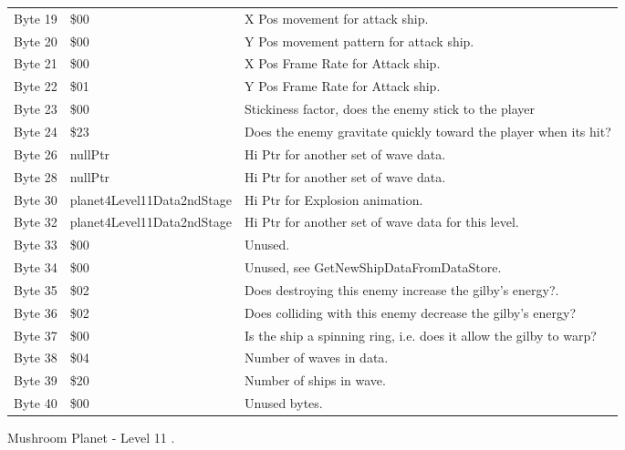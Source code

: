 \begin{figure}[H]
{\begin{adjustbox}{width=12cm}
\begin{tabular}{lll}
 Byte 19 & \$00                        & X Pos movement for attack ship.                                    \\
 Byte 20 & \$00                        & Y Pos movement pattern for attack ship.                            \\
 Byte 21 & \$00                        & X Pos Frame Rate for Attack ship.                                  \\
 Byte 22 & \$01                        & Y Pos Frame Rate for Attack ship.                                  \\
 Byte 23 & \$00                        & Stickiness factor, does the enemy stick to the player              \\
 Byte 24 & \$23                        & Does the enemy gravitate quickly toward the player when its hit?   \\
 Byte 26 & nullPtr                    & Hi Ptr for another set of wave data.                               \\
 Byte 28 & nullPtr                    & Hi Ptr for another set of wave data.                               \\
 Byte 30 & planet4Level11Data2ndStage & Hi Ptr for Explosion animation.                                    \\
 Byte 32 & planet4Level11Data2ndStage & Hi Ptr for another set of wave data for this level.                \\
 Byte 33 & \$00                        & Unused.                                                            \\
 Byte 34 & \$00                        & Unused, see GetNewShipDataFromDataStore.                           \\
 Byte 35 & \$02                        & Does destroying this enemy increase the gilby's energy?.           \\
 Byte 36 & \$02                        & Does colliding with this enemy decrease the gilby's energy?        \\
 Byte 37 & \$00                        & Is the ship a spinning ring, i.e. does it allow the gilby to warp? \\
 Byte 38 & \$04                        & Number of waves in data.                                           \\
 Byte 39 & \$20                        & Number of ships in wave.                                           \\
 Byte 40 & \$00                        & Unused bytes.                                                      \\
\bottomrule
\end{tabular}

  \end{adjustbox}

  }\caption*{Mushroom Planet - Level 11
.}
\end{figure}

